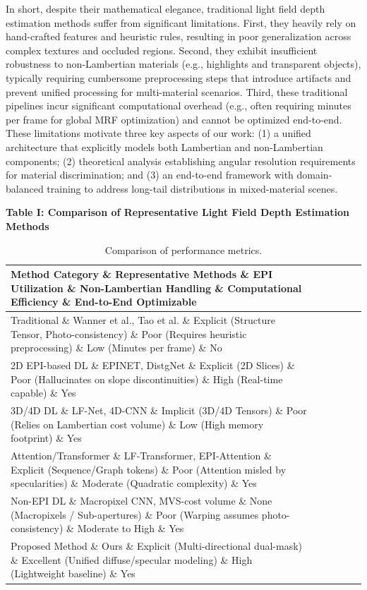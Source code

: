 In short, despite their mathematical elegance, traditional light field depth estimation methods suffer from significant limitations. First, they heavily rely on hand-crafted features and heuristic rules, resulting in poor generalization across complex textures and occluded regions. Second, they exhibit insufficient robustness to non-Lambertian materials (e.g., highlights and transparent objects), typically requiring cumbersome preprocessing steps that introduce artifacts and prevent unified processing for multi-material scenarios. Third, these traditional pipelines incur significant computational overhead (e.g., often requiring minutes per frame for global MRF optimization) and cannot be optimized end-to-end. These limitations motivate three key aspects of our work: (1) a unified architecture that explicitly models both Lambertian and non-Lambertian components; (2) theoretical analysis establishing angular resolution requirements for material discrimination; and (3) an end-to-end framework with domain-balanced training to address long-tail distributions in mixed-material scenes.

\textbf{Table I: Comparison of Representative Light Field Depth Estimation Methods}

\begin{table}[!t]
\small
\caption{Comparison of performance metrics.}
\label{tab:comparison}
\centering
\begin{tabular*}{\textwidth}{@{\extracolsep{\fill}}p{}p{}p{}p{}p{}p{}}
\toprule
Method Category \& Representative Methods \& EPI Utilization \& Non-Lambertian Handling \& Computational Efficiency \& End-to-End Optimizable \\
\midrule
Traditional \& Wanner et al., Tao et al. \& Explicit (Structure Tensor, Photo-consistency) \& Poor (Requires heuristic preprocessing) \& Low (Minutes per frame) \& No \\
2D EPI-based DL \& EPINET, DistgNet \& Explicit (2D Slices) \& Poor (Hallucinates on slope discontinuities) \& High (Real-time capable) \& Yes \\
3D/4D DL \& LF-Net, 4D-CNN \& Implicit (3D/4D Tensors) \& Poor (Relies on Lambertian cost volume) \& Low (High memory footprint) \& Yes \\
Attention/Transformer \& LF-Transformer, EPI-Attention \& Explicit (Sequence/Graph tokens) \& Poor (Attention misled by specularities) \& Moderate (Quadratic complexity) \& Yes \\
Non-EPI DL \& Macropixel CNN, MVS-cost volume \& None (Macropixels / Sub-apertures) \& Poor (Warping assumes photo-consistency) \& Moderate to High \& Yes \\
Proposed Method \& Ours \& Explicit (Multi-directional dual-mask) \& Excellent (Unified diffuse/specular modeling) \& High (Lightweight baseline) \& Yes \\
\bottomrule
\end{tabular*}
\end{table}
